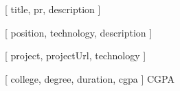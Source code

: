 \newenvironment{resumeSection} [1] {
    \sectionTitle{#1}
}

\newkeycommand{\openSourceItem} [
    title,
    pr,
    description
] {
    \begingroup
        \textbf{} \hfill {}
        \break
        \vspace{-2em}
        \vspace{-0.5em}
    \endgroup
}

\newkeycommand{\experienceItem} [
    position,
    technology,
    description
] {
    \begingroup
        \textbf{} \hfill {}
        \break
        \vspace{-2em}
        \vspace{-0.5em}
    \endgroup
}

\newkeycommand{\projectTitle}[
    project,
    projectUrl,
    technology
] {
    \large{\textbf{\href{https://\commandkey{projectUrl}}{}}} \hfill 
    \normalsize{\textsl{}}
    \break
}

\newkeycommand{\educationItem}[
    college,
    degree,
    duration,
    cgpa
] {
    \vspace{0.25em}
    \textbf{} \hspace*{2ex} \hspace*{2ex}  CGPA  \hfill   {}
    \break
}

\newcommand{\skill}[2]{
    \textbf{#1} & #2 \\
}